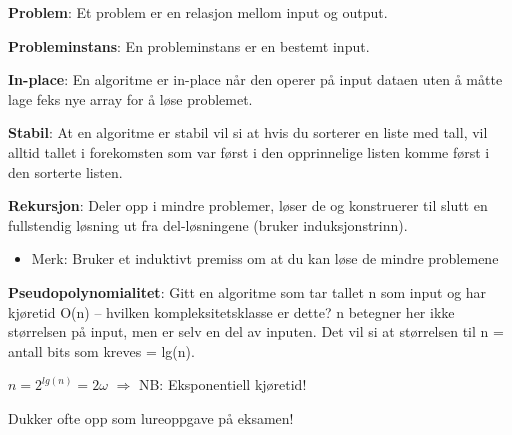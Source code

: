 \documentclass[12pt]{report}
\begin{document}
\vspace{\baselineskip}
\textbf{Problem}: Et problem er en relasjon mellom input og output.\par

\textbf{Probleminstans}: En probleminstans er en bestemt input.\par

\textbf{In-place}: En algoritme er in-place når den operer på input dataen uten å måtte lage feks nye array for å løse problemet.\par

\textbf{Stabil}: At en algoritme er stabil vil si at hvis du sorterer en liste med tall, vil alltid tallet i forekomsten som var først i den opprinnelige listen komme først i den sorterte listen.\par

\textbf{Rekursjon}: Deler opp i mindre problemer, løser de og konstruerer til slutt en fullstendig løsning ut fra del-løsningene (bruker induksjonstrinn).\par

\begin{itemize}
	\item Merk: Bruker et induktivt premiss om at du kan løse de mindre problemene
\end{itemize}\par


\vspace{\baselineskip}
\textbf{Pseudopolynomialitet}: Gitt en algoritme som tar tallet n som input og har kjøretid O(n) – hvilken kompleksitetsklasse er dette? n betegner her ikke størrelsen på input, men er selv en del av inputen. Det vil si at størrelsen til n = antall bits som kreves = lg(n).\par

\begin{adjustwidth}{0.98in}{0.0in}
 \( n=2^{lg⁡ \left( n \right) }=2 \omega  \)  $ \Rightarrow $  NB: Eksponentiell kjøretid! \par

\end{adjustwidth}

Dukker ofte opp som lureoppgave på eksamen!\par


\vspace{\baselineskip}

\vspace{\baselineskip}

\vspace{\baselineskip}
\end{document}
